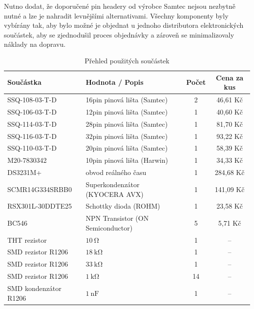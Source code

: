 Nutno dodat, že doporučené pin headery od výrobce Samtec nejsou nezbytně nutné a lze je nahradit levnějšími alternativami. Všechny komponenty byly vybírány tak, aby bylo možné je objednat u jednoho distributora elektronických součástek, aby se zjednodušil proces objednávky a zároveň se minimalizovaly náklady na dopravu.

\begin{table}[htbp]
    \centering
    \caption{Přehled použitých součástek}
    \begin{tabular}{|l|l|c|c|}
        \hline
        \textbf{Součástka} & \textbf{Hodnota / Popis} & \textbf{Počet} & \textbf{Cena za kus} \\
        \hline
        SSQ-108-03-T-D      & 16pin pinová lišta (Samtec)       & 2  & 46,61 Kč   \\ \hline
        SSQ-106-03-T-D      & 12pin pinová lišta (Samtec)       & 1  & 40,60 Kč   \\ \hline
        SSQ-114-03-T-D      & 28pin pinová lišta (Samtec)       & 1  & 81,70 Kč   \\ \hline
        SSQ-116-03-T-D      & 32pin pinová lišta (Samtec)       & 1  & 93,22 Kč   \\ \hline
        SSQ-110-03-T-D      & 20pin pinová lišta (Samtec)       & 1  & 58,39 Kč   \\ \hline
        M20-7830342         & 10pin pinová lišta (Harwin)       & 1  & 34,33 Kč   \\ \hline
        DS3231M+            & obvod reálného času               & 1  & 284,68 Kč  \\ \hline
        SCMR14G334SRBB0     & Superkondenzátor (KYOCERA AVX)    & 1  & 141,09 Kč  \\ \hline
        RSX301L-30DDTE25    & Schottky dioda (ROHM)             & 1  & 23,58 Kč   \\ \hline
        BC546               & NPN Transistor (ON Semiconductor) & 5  & 5,71 Kč    \\ \hline
        THT rezistor        & $\SI{10}{\ohm}$                   & 1  & --         \\ \hline
        SMD rezistor R1206  & $\SI{18}{\kilo\ohm}$              & 1  & --         \\ \hline
        SMD rezistor R1206  & $\SI{33}{\kilo\ohm}$              & 1  & --         \\ \hline
        SMD rezistor R1206  & $\SI{1}{\kilo\ohm}$               & 14 & --         \\ \hline
        SMD kondenzátor R1206  & $\SI{1}{\nano\farad}$          & 1  & --         \\ \hline
    \end{tabular}
\end{table}

